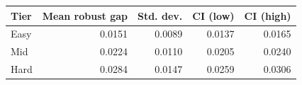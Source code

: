 \begin{tabular}{lrrrr}
\hline
Tier & Mean robust gap & Std. dev. & CI (low) & CI (high) \\
\hline
Easy & 0.0151 & 0.0089 & 0.0137 & 0.0165 \\
Mid & 0.0224 & 0.0110 & 0.0205 & 0.0240 \\
Hard & 0.0284 & 0.0147 & 0.0259 & 0.0306 \\
\hline
\end{tabular}
